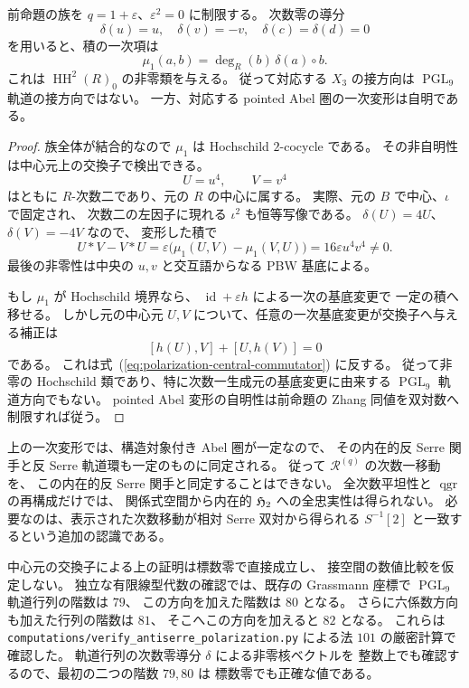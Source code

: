 \begin{proposition}
\label{prop:antiserre-polarization-tangent}
前命題の族を $q=1+\varepsilon$、$\varepsilon^2=0$ に制限する。
次数零の導分
\[
 \delta(u)=u,\quad\delta(v)=-v,\quad\delta(c)=\delta(d)=0
\]
を用いると、積の一次項は
\[
 \mu_1(a,b)=\deg_R(b)\,\delta(a)\mathbin{\circ}b.
\]
これは $\operatorname{HH}^2(R)_0$ の非零類を与える。
従って対応する $X_3$ の接方向は $\operatorname{PGL}_9$ 軌道の接方向ではない。
一方、対応する pointed Abel 圏の一次変形は自明である。
\end{proposition}
\begin{proof}
族全体が結合的なので $\mu_1$ は Hochschild $2$-cocycle である。
その非自明性は中心元上の交換子で検出できる。
\[
 U=u^4,\qquad V=v^4
\]
はともに $R$-次数二であり、元の $R$ の中心に属する。
実際、元の $B$ で中心、$\iota$ で固定され、
次数二の左因子に現れる $\iota^2$ も恒等写像である。
$\delta(U)=4U$、$\delta(V)=-4V$ なので、
変形した積で
\[
 U*V-V*U
 =\varepsilon\bigl(\mu_1(U,V)-\mu_1(V,U)\bigr)
 =16\varepsilon u^4v^4\ne0.
 \tag{P-comm}\label{eq:polarization-central-commutator}
\]
最後の非零性は中央の $u,v$ と交互語からなる PBW 基底による。

もし $\mu_1$ が Hochschild 境界なら、
$\operatorname{id}+\varepsilon h$ による一次の基底変更で
一定の積へ移せる。
しかし元の中心元 $U,V$ について、任意の一次基底変更が交換子へ与える補正は
\[
 [h(U),V]+[U,h(V)]=0
\]
である。
これは式~(\ref{eq:polarization-central-commutator}) に反する。
従って非零の Hochschild 類であり、特に次数一生成元の基底変更に由来する
$\operatorname{PGL}_9$ 軌道方向でもない。
pointed Abel 変形の自明性は前命題の Zhang 同値を双対数へ制限すれば従う。
\end{proof}

\begin{remark}
上の一次変形では、構造対象付き Abel 圏が一定なので、
その内在的反 Serre 関手と反 Serre 軌道環も一定のものに同定される。
従って $\mathcal R^{(q)}$ の次数一移動を、
この内在的反 Serre 関手と同定することはできない。
全次数平坦性と $\operatorname{qgr}$ の再構成だけでは、
関係式空間から内在的 $\mathfrak H_2$ への全忠実性は得られない。
必要なのは、表示された次数移動が相対 Serre 双対から得られる
$S^{-1}[2]$ と一致するという追加の認識である。

中心元の交換子による上の証明は標数零で直接成立し、
接空間の数値比較を仮定しない。
独立な有限線型代数の確認では、既存の Grassmann 座標で
$\operatorname{PGL}_9$ 軌道行列の階数は $79$、
この方向を加えた階数は $80$ となる。
さらに六係数方向も加えた行列の階数は $81$、
そこへこの方向を加えると $82$ となる。
これらは
\texttt{computations/verify\_antiserre\_polarization.py}
による法 $101$ の厳密計算で確認した。
軌道行列の次数零導分 $\delta$ による非零核ベクトルを
整数上でも確認するので、最初の二つの階数 $79,80$ は
標数零でも正確な値である。
\end{remark}

